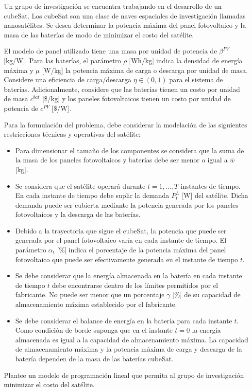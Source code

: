 Un grupo de investigación se encuentra trabajando en el desarrollo de un cubeSat. Los cubeSat son una clase de naves espaciales de investigación llamadas nanosatélites. Se desea determinar la potencia máxima del panel fotovoltaico y la masa de las baterías de modo de minimizar el costo del satélite.

El modelo de panel utilizado tiene una masa por unidad de potencia de $\beta^{PV}$ [kg/W]. Para las baterías, el parámetro $\rho$ [Wh/kg] indica la densidad de energía máxima y $\mu$ [W/kg] la potencia máxima de carga o descarga por unidad de masa. Considere una eficiencia de carga/descarga $\eta \in (0, 1)$ para el sistema de baterías. Adicionalmente, considere que las baterías tienen un costo por unidad de masa $c^{bat}$ [\$/kg] y los paneles fotovoltaicos tienen un costo por unidad de potencia de $c^{PV}$ [\$/W].

Para la formulación del problema, debe considerar la modelación de las siguientes restricciones técnicas y operativas del satélite:

\begin{itemize}
    \item Para dimensionar el tamaño de los componentes se considera que la suma de la masa de los paneles fotovoltaicos y baterías debe ser menor o igual a $\bar{w}$ [kg].

    \item Se considera que el satélite operará durante $t = 1, \dots, T$ instantes de tiempo. En cada instante de tiempo debe suplir la demanda $P_t^L$ [W] del satélite. Dicha demanda puede ser cubierta mediante la potencia generada por los paneles fotovoltaicos y la descarga de las baterías.

    \item Debido a la trayectoria que sigue el cubeSat, la potencia que puede ser generada por el panel fotovoltaico varía en cada instante de tiempo. El parámetro $\alpha_t$ [\%] indica el porcentaje de la potencia máxima del panel fotovoltaico que puede ser efectivamente generada en el instante de tiempo $t$.

    \item Se debe considerar que la energía almacenada en la batería en cada instante de tiempo $t$ debe encontrarse dentro de los límites permitidos por el fabricante. No puede ser menor que un porcentaje $\gamma$ [\%] de su capacidad de almacenamiento máxima establecido por el fabricante.

    \item Se debe considerar el balance de energía en la batería para cada instante $t$. Como condición de borde suponga que en el instante $t = 0$ la energía almacenada es igual a la capacidad de almacenamiento máxima. La capacidad de almacenamiento máxima y la potencia máxima de carga y descarga de la batería dependen de la masa de las baterías cubeSat.
\end{itemize}

Plantee un modelo de programación lineal que permita al grupo de investigación minimizar el costo del satélite.
